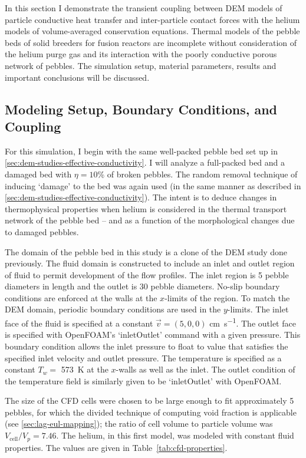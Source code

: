 In this section I demonstrate the transient coupling between DEM models of particle conductive heat transfer and inter-particle contact forces with the helium models of volume-averaged conservation equations. Thermal models of the pebble beds of solid breeders for fusion reactors are incomplete without consideration of the helium purge gas and its interaction with the poorly conductive porous network of pebbles. The simulation setup, material parameters, results and important conclusions will be discussed.
\subsection{Modeling Setup, Boundary Conditions, and Coupling}\label{sec:cfd-dem-setup}
For this simulation, I begin with the same well-packed pebble bed set up in \cref{sec:dem-studies-effective-conductivity}. I will analyze a full-packed bed and a damaged bed with $\eta = 10$\% of broken pebbles. The random removal technique of inducing `damage' to the bed was again used (in the same manner as described in \cref{sec:dem-studies-effective-conductivity}). The intent is to deduce changes in thermophysical properties when helium is considered in the thermal transport network of the pebble bed -- and as a function of the morphological changes due to damaged pebbles.

The domain of the pebble bed in this study is a clone of the DEM study done previously. The fluid domain is constructed to include an inlet and outlet region of fluid to permit development of the flow profiles. The inlet region is 5 pebble diameters in length and the outlet is 30 pebble diameters. No-slip boundary conditions are enforced at the walls at the $x$-limits of the region. To match the DEM domain, periodic boundary conditions are used in the $y$-limits. The inlet face of the fluid is specified at a constant $\vec{v} = (5, 0, 0)$ \si{\centi\meter\per\second}. The outlet face is specified with OpenFOAM's `inletOutlet' command with a given pressure. This boundary condition allows the inlet pressure to float to value that satisfies the specified inlet velocity and outlet pressure. The temperature is specified as a constant $T_w = $ \SI{573}{\kelvin} at the $x$-walls as well as the inlet. The outlet condition of the temperature field is similarly given to be `inletOutlet' with OpenFOAM.

The size of the CFD cells were chosen to be large enough to fit approximately 5 pebbles, for which the divided technique of computing void fraction is applicable (see \cref{sec:lag-eul-mapping}); the ratio of cell volume to particle volume was $V_\text{cell} / V_p = 7.46$. The helium, in this first model, was modeled with constant fluid properties. The values are given in Table~\ref{tab:cfd-properties}.

